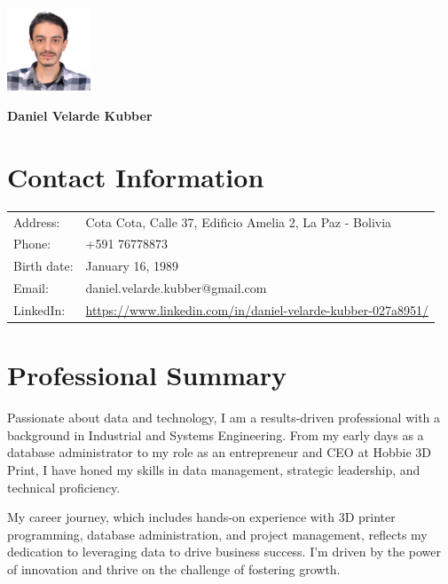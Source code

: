 \documentclass[a4paper,10pt]{article}
\begin{document}
\begin{minipage}[t]{0.7\textwidth}
\end{minipage}
\hfill
\begin{minipage}[t]{0.3\textwidth}
  \includegraphics[width=2.5cm]{photocv.jpeg}
\end{minipage}

\begin{center}
\textbf{\LARGE Daniel Velarde Kubber}
\end{center}

\section*{Contact Information}
\begin{tabular}{ll}
    Address: & Cota Cota, Calle 37, Edificio Amelia 2, La Paz - Bolivia \\
    Phone: & +591 76778873 \\
    Birth date: & January 16, 1989\\
    Email: & daniel.velarde.kubber@gmail.com \\
    LinkedIn: & \url{https://www.linkedin.com/in/daniel-velarde-kubber-027a8951/} \\
\end{tabular}

\section*{Professional Summary}
Passionate about data and technology, I am a results-driven professional with a background in Industrial and Systems Engineering. From my early days as a database administrator to my role as an entrepreneur and CEO at Hobbie 3D Print, I have honed my skills in data management, strategic leadership, and technical proficiency.

My career journey, which includes hands-on experience with 3D printer programming, database administration, and project management, reflects my dedication to leveraging data to drive business success. I'm driven by the power of innovation and thrive on the challenge of fostering growth.
\end{document}
